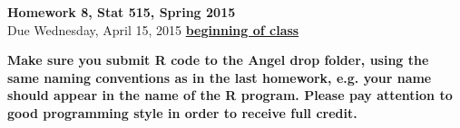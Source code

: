 \documentclass{article}
\begin{document}
\begin{center}
\Large
{\bf Homework 8, Stat 515, Spring 2015}\\
\normalsize
Due Wednesday, April 15, 2015 \underline{{\bf beginning of class}}\\
\end{center}
  {\bf Make sure you submit R code to the Angel drop folder, using
  the same naming conventions as in the last homework, e.g. your name
  should appear in the name of the R program. Please pay attention
to good programming style in order to receive full credit.}
\end{document}

